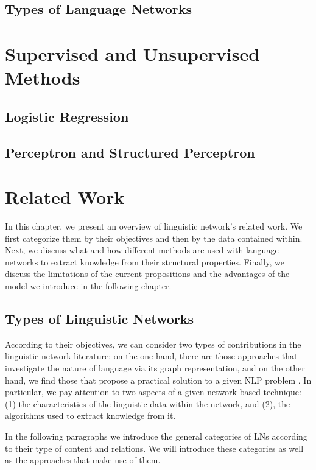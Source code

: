 \subsection{Types of Language Networks}

\section{Supervised and Unsupervised Methods}
\subsection{Logistic Regression}
\subsection{Perceptron and Structured Perceptron}


\section{Related Work}



In this chapter, we present an overview of linguistic network's related work. We first categorize them by their objectives and then by the data contained within. Next, we discuss what and how different methods are used with language networks to extract knowledge from their structural properties. Finally, we discuss the limitations of the current propositions and the advantages of the model we introduce in the following chapter.
\subsection{Types of Linguistic Networks}

According to their objectives, we can consider two types of contributions in the linguistic-network literature: on the one hand, there are those approaches that investigate the nature of language via its graph representation, and on the other hand, we find those that propose a practical solution to a given NLP problem  \cite{Choudhury2009}. In particular, we pay attention to two aspects of a given network-based technique: (1) the  characteristics of the linguistic data within the network, and (2), the  algorithms used to extract knowledge from it.


In the following paragraphs we introduce the general categories of LNs according to their type of content and relations. We will introduce these categories as well as the  approaches that make use of them.

